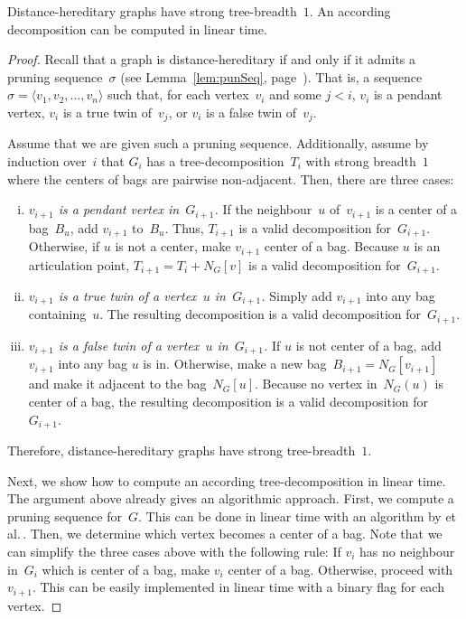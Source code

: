 \begin{theorem}
    \label{theo:DHistb}
Distance-hereditary graphs have strong tree-breadth~\( 1 \).
An according decomposition can be computed in linear time.
\end{theorem}

\begin{proof}
Recall that a graph is distance-hereditary if and only if it admits a pruning sequence~$\sigma$ (see Lemma~\ref{lem:punSeq}, page~\pageref{lem:punSeq}).
That is, a sequence $\sigma = \langle v_1, v_2, \ldots, v_n \rangle$ such that, for each vertex~$v_i$ and some $j < i$, $v_i$ is a pendant vertex, $v_i$ is a true twin of~$v_j$, or $v_i$ is a false twin of~$v_j$.

Assume that we are given such a pruning sequence.
Additionally, assume by induction over~$i$ that $G_i$ has a tree-decomposition~$T_i$ with strong breadth~$1$ where the centers of bags are pairwise non-adjacent.
Then, there are three cases:
\begin{enumerate}[(i)]
    \item
        \emph{\( v_{i+1} \) is a pendant vertex in~\( G_{i+1} \).}
        If the neighbour~$u$ of~$v_{i+1}$ is a center of a bag~$B_u$, add $v_{i+1}$ to~$B_u$.
        Thus, $T_{i+1}$ is a valid decomposition for~$G_{i+1}$.
        Otherwise, if $u$ is not a center, make $v_{i+1}$ center of a bag.
        Because $u$ is an articulation point, $T_{i+1} = T_i + N_G[v]$ is a valid decomposition for~$G_{i+1}$.
    \item
        \emph{\( v_{i+1} \) is a true twin of a vertex~\( u \) in~\( G_{i+1} \).}
        Simply add $v_{i+1}$ into any bag containing~$u$.
        The resulting decomposition is a valid decomposition for~$G_{i+1}$.
    \item
        \emph{\( v_{i+1} \) is a false twin of a vertex~\( u \) in~\( G_{i+1} \).}
        If $u$ is not center of a bag, add $v_{i+1}$ into any bag $u$ is in.
        Otherwise, make a new bag~$B_{i+1} = N_G[v_{i+1}]$ and make it adjacent to the bag~$N_G[u]$.
        Because no vertex in~$N_G(u)$ is center of a bag, the resulting decomposition is a valid decomposition for~$G_{i+1}$.
\end{enumerate}
Therefore, distance-hereditary graphs have strong tree-breadth~$1$.

Next, we show how to compute an according tree-decomposition in linear time.
The argument above already gives an algorithmic approach.
First, we compute a pruning sequence for~$G$.
This can be done in linear time with an algorithm by  et al.\,\cite{DamiHabiPaul2001}.
Then, we determine which vertex becomes a center of a bag.
Note that we can simplify the three cases above with the following rule:
If $v_i$ has no neighbour in~$G_i$ which is center of a bag, make $v_i$ center of a bag.
Otherwise, proceed with~$v_{i+1}$.
This can be easily implemented in linear time with a binary flag for each vertex.
\end{proof}

